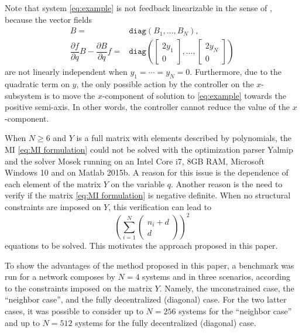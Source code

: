 \documentclass[10pt,twocolumn,twoside]{IEEEtran}
\theoremstyle{plain}
\theoremstyle{definition}
\theoremstyle{remark}
\begin{document}
Note that system \eqref{eq:example} is not feedback linearizable in the sense of \cite{Isidori:1995}, because the vector fields
\begin{align*}
	B=&\mathbin{\mathtt{diag}}(B_1,\ldots,B_N),\\
	\dfrac{\partial f}{\partial q}B-\dfrac{\partial B}{\partial q}f=&\mathbin{\mathtt{diag}}\left(\begin{bmatrix}
	2y_1\\0
	\end{bmatrix},\ldots,\begin{bmatrix}
	2y_N\\0
	\end{bmatrix}\right)
\end{align*}
are not linearly independent when $y_1=\cdots=y_N=0$.  Furthermore, due to the quadratic term on $y$, the only possible action by the controller on the $x$-subsystem is to move the $x$-component of solution to \eqref{eq:example} towards the positive semi-axis. In other words, the controller cannot reduce the value of the $x$-component.

When $N\geq6$ and $Y$ is a full matrix with elements described by polynomials, the MI \eqref{eq:MI formulation} could not be solved with the optimization parser Yalmip \cite{Loefberg2004,Loefberg2009} and the solver Mosek running on an Intel Core i7, 8GB RAM, Microsoft Windows 10 and on Matlab 2015b. A reason for this issue is the dependence of each element of the matrix $Y$ on the variable $q$. Another reason is the need to verify if the matrix \eqref{eq:MI formulation} is negative definite. When no structural constraints are imposed on $Y$, this verification can lead to
\begin{equation*}
\left(\sum_{i=1}^N\begin{pmatrix}
n_i+d\\ d
\end{pmatrix}\right)^2
\end{equation*}
equations to be solved. This motivates the approach proposed in this paper.

To show the advantages of the method proposed in this paper, a benchmark was run for a network composes by $N=4$ systems and in three scenarios, according to the constraints imposed on the matrix $Y$. Namely, the unconstrained case, the ``neighbor case'', and the fully decentralized (diagonal) case. For the two latter cases, it was possible to consider up to $N=256$ systems for the ``neighbor case'' and up to $N=512$ systems for the fully decentralized (diagonal) case.
\end{document}
